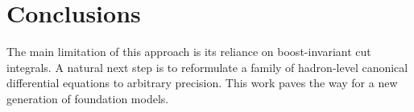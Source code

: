 \section{Conclusions}\label{sec:conclusions}

The main limitation of this approach is its reliance on boost-invariant
cut integrals. A natural next step is to reformulate a family of
hadron-level canonical differential equations to arbitrary precision.
This work paves the way for a new generation of foundation models.

